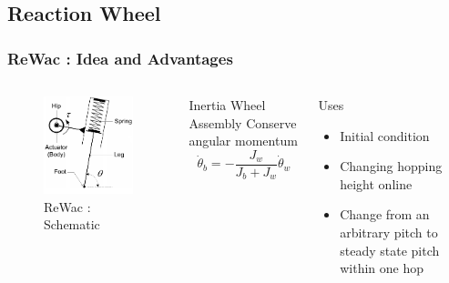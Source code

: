 \subsection*{Reaction Wheel}
\begin{frame}
\frametitle{ReWac : Idea and Advantages}
\begin{columns}

\begin{figure}
\includegraphics[width=\textwidth]{fig/slom.pdf}
\caption{ReWac : Schematic}
\end{figure}

\begin{block}{Inertia Wheel Assembly}
Conserve angular momentum
\begin{equation*}
\dot{\theta}_b = -\frac{J_{w}}{J_{b}+J_{w}}\dot{\theta}_w
\end{equation*}
\end{block}

\vspace{0.5in}
\begin{block}{Uses}
\begin{itemize}
\item
Initial condition\\[0.1in]
\item
Changing hopping height online\\[0.1in]
\item
Change from an \alert{arbitrary} pitch to \alert{steady state} pitch
within one hop
\end{itemize}
\end{block}
\end{columns}

\end{frame}

